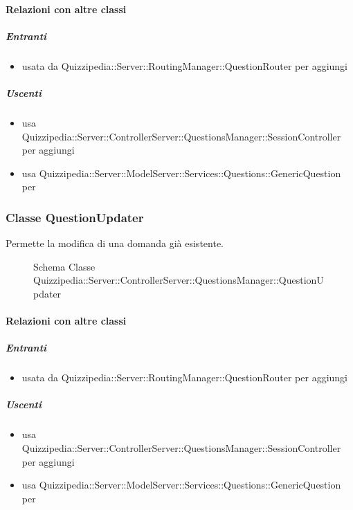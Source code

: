\paragraph{Relazioni con altre classi}
\subparagraph{Entranti}
\begin{itemize}
\item usata da Quizzipedia::Server::RoutingManager::QuestionRouter per aggiungi
\end{itemize}
\subparagraph{Uscenti}
\begin{itemize}
\item usa Quizzipedia::Server::ControllerServer::QuestionsManager::SessionController per aggiungi
\item usa Quizzipedia::Server::ModelServer::Services::Questions::GenericQuestion per 
\end{itemize}
\subsubsection{Classe QuestionUpdater}
Permette la modifica di una domanda già esistente.
\begin{figure}[H]
\centering
\noindent{}
\caption[Schema Classe QuestionUpdater]{Schema Classe Quizzipedia::Server::ControllerServer::QuestionsManager::QuestionUpdater}
\end{figure}
\paragraph{Relazioni con altre classi}
\subparagraph{Entranti}
\begin{itemize}
\item usata da Quizzipedia::Server::RoutingManager::QuestionRouter per aggiungi
\end{itemize}
\subparagraph{Uscenti}
\begin{itemize}
\item usa Quizzipedia::Server::ControllerServer::QuestionsManager::SessionController per aggiungi
\item usa Quizzipedia::Server::ModelServer::Services::Questions::GenericQuestion per 
\end{itemize}
